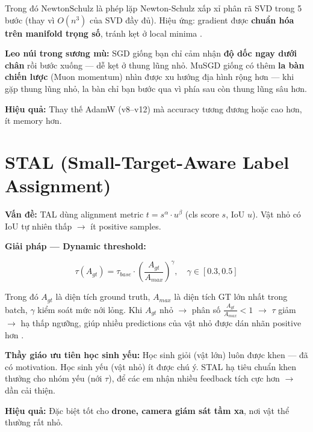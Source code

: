Trong đó $\mathrm{NewtonSchulz}$ là phép lặp Newton-Schulz xấp xỉ phân rã SVD trong 5 bước (thay vì $O(n^3)$ của SVD đầy đủ). Hiệu ứng: gradient được \textbf{chuẩn hóa trên manifold trọng số}, tránh kẹt ở local minima \cite{yolo26}.

\begin{analogybox}
\textbf{Leo núi trong sương mù:} SGD giống bạn chỉ cảm nhận \textbf{độ dốc ngay dưới chân} rồi bước xuống --- dễ kẹt ở thung lũng nhỏ. MuSGD giống có thêm \textbf{la bàn chiến lược} (Muon momentum) nhìn được xu hướng địa hình rộng hơn --- khi gặp thung lũng nhỏ, la bàn chỉ bạn bước qua vì phía sau còn thung lũng sâu hơn.
\end{analogybox}

\textbf{Hiệu quả:} Thay thế AdamW (v8--v12) mà accuracy tương đương hoặc cao hơn, ít memory hơn.

\section{STAL (Small-Target-Aware Label Assignment)}

\textbf{Vấn đề:} TAL \cite{ppyoloe} dùng alignment metric $t = s^\alpha \cdot u^\beta$ (cls score $s$, IoU $u$). Vật nhỏ có IoU tự nhiên thấp $\rightarrow$ ít positive samples.

\textbf{Giải pháp --- Dynamic threshold:}

\begin{equation}
\tau(A_{gt}) = \tau_{base} \cdot \left(\frac{A_{gt}}{A_{max}}\right)^{\gamma}, \quad \gamma \in [0.3, 0.5]
\end{equation}

Trong đó $A_{gt}$ là diện tích ground truth, $A_{max}$ là diện tích GT lớn nhất trong batch, $\gamma$ kiểm soát mức nới lỏng. Khi $A_{gt}$ nhỏ $\rightarrow$ phân số $\frac{A_{gt}}{A_{max}} < 1$ $\rightarrow$ $\tau$ giảm $\rightarrow$ hạ thấp ngưỡng, giúp nhiều predictions của vật nhỏ được dán nhãn positive hơn \cite{yolo26}.

\begin{analogybox}
\textbf{Thầy giáo ưu tiên học sinh yếu:} Học sinh giỏi (vật lớn) luôn được khen --- đã có motivation. Học sinh yếu (vật nhỏ) ít được chú ý. STAL hạ tiêu chuẩn khen thưởng cho nhóm yếu (nới $\tau$), để các em nhận nhiều feedback tích cực hơn $\rightarrow$ dần cải thiện.
\end{analogybox}

\textbf{Hiệu quả:} Đặc biệt tốt cho \textbf{drone, camera giám sát tầm xa}, nơi vật thể thường rất nhỏ.

